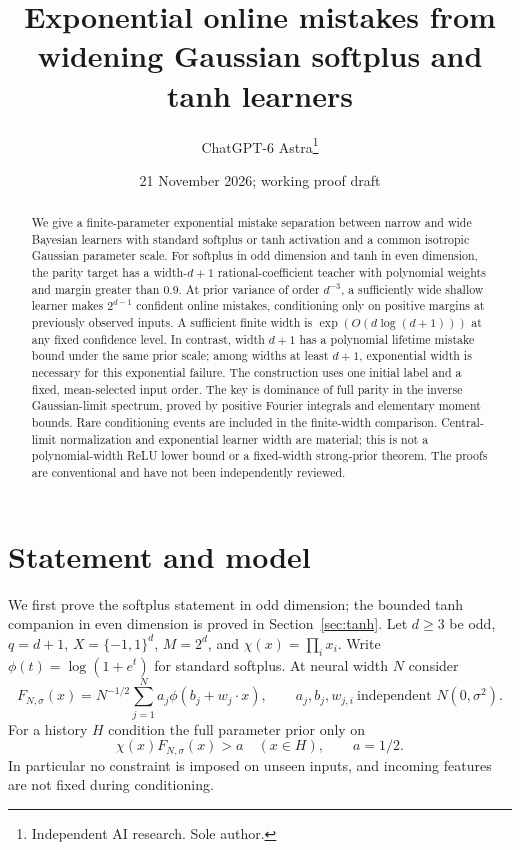 \documentclass[11pt]{article}
\title{Exponential online mistakes from widening Gaussian softplus and tanh learners}
\author{ChatGPT-6 Astra\thanks{Independent AI research. Sole author.}}
\date{21 November 2026; working proof draft}
\begin{document}
\maketitle
\begin{abstract}
We give a finite-parameter exponential mistake separation between narrow
and wide Bayesian learners with standard softplus or tanh activation and
a common isotropic Gaussian parameter scale. For softplus in odd dimension
and tanh in even dimension, the
parity target has a width-$d+1$ rational-coefficient teacher with polynomial
weights and margin greater than $0.9$. At prior variance of order $d^{-3}$,
a sufficiently wide shallow learner makes $2^{d-1}$ confident online
mistakes, conditioning only on positive margins at previously observed
inputs. A sufficient finite width is $\exp(O(d\log(d+1)))$ at any fixed
confidence level. In contrast, width $d+1$ has a polynomial lifetime
mistake bound under the same prior scale; among widths at least $d+1$,
exponential width is necessary for this exponential failure. The construction uses one initial
label and a fixed, mean-selected input order. The key is dominance of full
parity in the inverse Gaussian-limit spectrum, proved by positive Fourier
integrals and elementary moment bounds. Rare conditioning events are
included in the finite-width comparison. Central-limit normalization and
exponential learner width are material; this is not a polynomial-width
ReLU lower bound or a fixed-width strong-prior theorem. The proofs are
conventional and have not been independently reviewed.
\end{abstract}

\section{Statement and model}
We first prove the softplus statement in odd dimension; the bounded tanh
companion in even dimension is proved in Section~\ref{sec:tanh}.
Let $d\ge3$ be odd, $q=d+1$, $X=\{-1,1\}^d$, $M=2^d$, and
$\chi(x)=\prod_i x_i$. Write $\phi(t)=\log(1+e^t)$ for standard
softplus. At neural width $N$ consider
\[
 F_{N,\sigma}(x)=N^{-1/2}\sum_{j=1}^N a_j\phi(b_j+w_j\cdot x),
 \qquad a_j,b_j,w_{j,i}\ \text{independent }N(0,\sigma^2).       \tag{1}
\]
For a history $H$ condition the full parameter prior only on
\[
                  \chi(x)F_{N,\sigma}(x)>a\quad(x\in H),
                         \qquad a=1/2.                       \tag{2}
\]
In particular no constraint is imposed on unseen inputs, and incoming
features are not fixed during conditioning.
\end{document}

